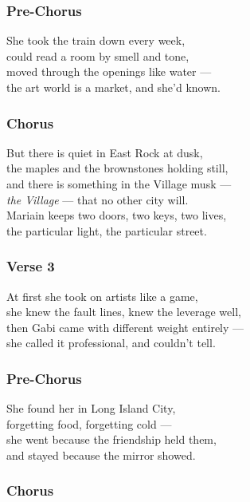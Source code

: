 \subsubsection{Pre-Chorus}\label{pre-chorus-51}

She took the train down every week,\\
could read a room by smell and tone,\\
moved through the openings like water ---\\
the art world is a market, and she'd known.

\subsubsection{Chorus}\label{chorus-69}

But there is quiet in East Rock at dusk,\\
the maples and the brownstones holding still,\\
and there is something in the Village musk ---\\
\emph{the Village} --- that no other city will.\\
Mariain keeps two doors, two keys, two lives,\\
the particular light, the particular street.

\subsubsection{Verse 3}\label{verse-3-16}

At first she took on artists like a game,\\
she knew the fault lines, knew the leverage well,\\
then Gabi came with different weight entirely ---\\
she called it professional, and couldn't tell.

\subsubsection{Pre-Chorus}\label{pre-chorus-52}

She found her in Long Island City,\\
forgetting food, forgetting cold ---\\
she went because the friendship held them,\\
and stayed because the mirror showed.

\subsubsection{Chorus}\label{chorus-70}

